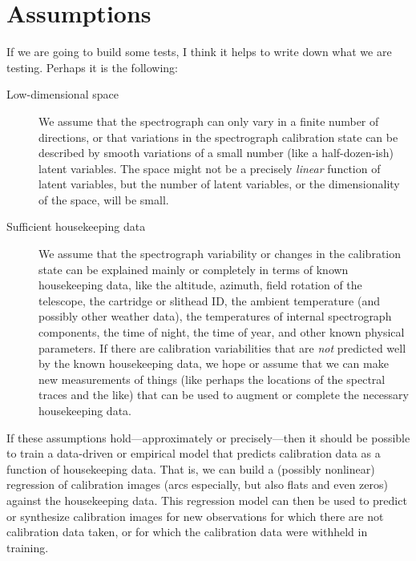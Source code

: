 \documentclass[modern]{aastex631}
\begin{document}
\section{Assumptions}\label{sec:ass}\noindent
If we are going to build some tests, I think it helps to write down what we are testing. Perhaps it is the following:
\begin{description}
    \item[Low-dimensional space]
    We assume that the spectrograph can only vary in a finite number of directions, or that variations in the spectrograph calibration state can be described by smooth variations of a small number (like a half-dozen-ish) latent variables.
    The space might not be a precisely \emph{linear} function of latent variables, but the number of latent variables, or the dimensionality of the space, will be small.
    \item[Sufficient housekeeping data]
    We assume that the spectrograph variability or changes in the calibration state can be explained mainly or completely in terms of known housekeeping data, like the altitude, azimuth, field rotation of the telescope, the cartridge or slithead ID, the ambient temperature (and possibly other weather data), the temperatures of internal spectrograph components, the time of night, the time of year, and other known physical parameters.
    If there are calibration variabilities that are \emph{not} predicted well by the known housekeeping data, we hope or assume that we can make new measurements of things (like perhaps the locations of the spectral traces and the like) that can be used to augment or complete the necessary housekeeping data.
\end{description}
If these assumptions hold---approximately or precisely---then it should be possible to train a data-driven or empirical model that predicts calibration data as a function of housekeeping data.
That is, we can build a (possibly nonlinear) regression of calibration images (arcs especially, but also flats and even zeros) against the housekeeping data.
This regression model can then be used to predict or synthesize calibration images for new observations for which there are not calibration data taken, or for which the calibration data were withheld in training.
\end{document}
